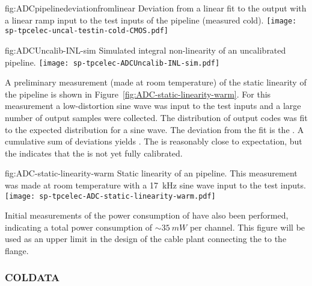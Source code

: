 \begin{dunefigure}
{fig:ADCpipelinedeviationfromlinear}
{Deviation from a linear fit to the  output with a linear ramp input to the test inputs of the
   pipeline (measured cold).}
\texttt{[image: sp-tpcelec-uncal-testin-cold-CMOS.pdf]}
\end{dunefigure}

\begin{dunefigure}
{fig:ADCUncalib-INL-sim}
{Simulated integral non-linearity of an uncalibrated  pipeline.}
\texttt{[image: sp-tpcelec-ADCUncalib-INL-sim.pdf]}
\end{dunefigure}

A preliminary measurement (made at room temperature) of the static linearity of the  pipeline is
shown in Figure~\ref{fig:ADC-static-linearity-warm}.  For this measurement a low-distortion sine wave was
input to the test inputs and a large number of output samples were collected.  The distribution of output
codes was fit to the expected distribution for a sine wave.  The deviation from the fit is the .
A cumulative sum of deviations yields . The  is reasonably close to expectation,
but the  indicates that the  is not yet fully calibrated.

\begin{dunefigure}
{fig:ADC-static-linearity-warm}
{Static linearity of an  pipeline.  This measurement was made at room temperature with a
\SI{17}{kHz} sine wave input to the test inputs.}
\texttt{[image: sp-tpcelec-ADC-static-linearity-warm.pdf]}
\end{dunefigure}

Initial measurements of the power consumption of  have also been
performed, indicating a total power consumption of $\sim\SI{35}{mW}$ per channel.
This figure will be used as an upper limit in the design of the cable plant 
connecting the  to the  flange.


\subsubsection{COLDATA }
\label{sec:fdsp-tpcelec-design-femb-coldata}

